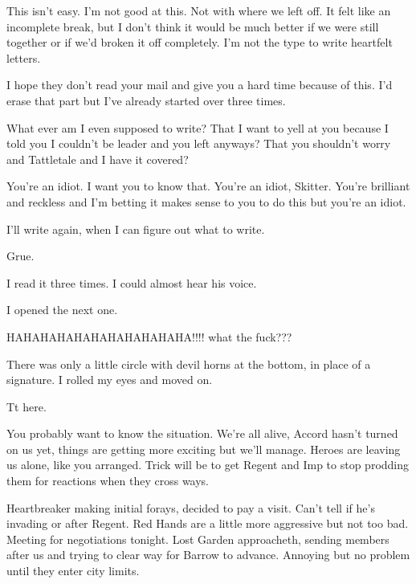 This isn't easy.  I'm not good at this.  Not with where we left off.  It felt like an incomplete break, but I don't think it would be much better if we were still together or if we'd broken it off completely.  I'm not the type to write heartfelt letters.



I hope they don't read your mail and give you a hard time because of this.  I'd erase that part but I've already started over three times.



What ever am I even supposed to write?  That I want to yell at you because I told you I couldn't be leader and you left anyways?  That you shouldn't worry and Tattletale and I have it covered?



You're an idiot.  I want you to know that.  You're an idiot, Skitter.  You're brilliant and reckless and I'm betting it makes sense to you to do this but you're an idiot.



I'll write again, when I can figure out what to write.



Grue.



I read it three times.  I could almost hear his voice.



I opened the next one.



HAHAHAHAHAHAHAHAHAHAHA!!!! what the fuck???



There was only a little circle with devil horns at the bottom, in place of a signature.  I rolled my eyes and moved on.



Tt here.



You probably want to know the situation.  We're all alive, Accord hasn't turned on us yet, things are getting more exciting but we'll manage.  Heroes are leaving us alone, like you arranged.  Trick will be to get Regent and Imp to stop prodding them for reactions when they cross ways.



Heartbreaker making initial forays, decided to pay a visit.  Can't tell if he's invading or after Regent.  Red Hands are a little more aggressive but not too bad.  Meeting for negotiations tonight.  Lost Garden approacheth, sending members after us and trying to clear way for Barrow to advance.  Annoying but no problem until they enter city limits.



